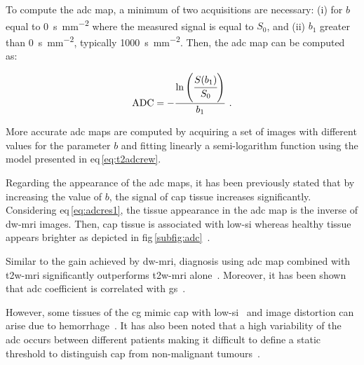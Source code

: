 To compute the \ac{adc} map, a minimum of two acquisitions are necessary: (i) for $b$ equal to \SI{0}{\second\per\milli\metre\squared} where the measured signal is equal to $S_0$, and (ii) $b_1$ greater than \SI{0}{\second\per\milli\metre\squared}, typically \SI{1000}{\second\per\milli\metre\squared}.
Then, the \ac{adc} map can be computed as:

\begin{equation}
	\text{ADC} = - \frac{\ln \left( \cfrac{S(b_1)}{S_0} \right) }{b_1} \ .
	\label{eq:adcres1}
\end{equation}

More accurate \ac{adc} maps are computed by acquiring a set of images with different values for the parameter $b$ and fitting linearly a semi-logarithm function using the model presented in \acs{eq}\,\eqref{eq:t2adcrew}.

Regarding the appearance of the \ac{adc} maps, it has been previously stated that by increasing the value of $b$, the signal of \ac{cap} tissue increases significantly.
Considering \acs{eq}\,\eqref{eq:adcres1}, the tissue appearance in the \ac{adc} map is the inverse of \ac{dw}-\ac{mri} images.
Then, \ac{cap} tissue is associated with low-\ac{si} whereas healthy tissue appears brighter as depicted in \acs{fig}\,\ref{subfig:adc}~\cite{Barentsz2012}.

Similar to the gain achieved by \ac{dw}-\ac{mri}, diagnosis using \ac{adc} map combined with \ac{t2w}-\ac{mri} significantly outperforms \ac{t2w}-\ac{mri} alone~\cite{Doo2012,Choi2007}.
Moreover, it has been shown that \ac{adc} coefficient is correlated with \ac{gs}~\cite{Hambrock2011,Itou2011,Peng2013}.

However, some tissues of the \ac{cg} mimic \ac{cap} with low-\ac{si}~\cite{Kirkham2006} and image distortion can arise due to hemorrhage~\cite{Choi2007}.
It has also been noted that a high variability of the \ac{adc} occurs between different patients making it difficult to define a static threshold to distinguish \ac{cap} from non-malignant tumours~\cite{Choi2007}. 


